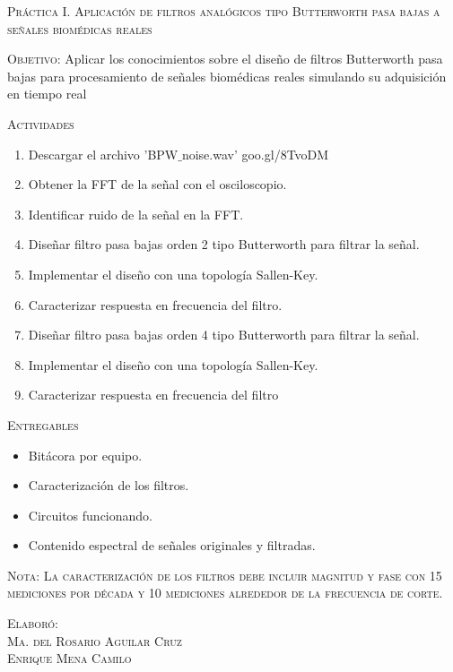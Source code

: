 \documentclass[10pt,letterpaper,spanish,twoside]{report}
\begin{document}
\docdate

\begin{center}
 \textsc{\asignatura}\vspace{.2em}
\end{center}

\textsc{Práctica I. Aplicación de filtros analógicos tipo Butterworth pasa bajas a señales biomédicas reales}

\textsc{Objetivo:} Aplicar los conocimientos sobre el diseño de filtros Butterworth pasa bajas para procesamiento de señales biomédicas reales simulando su adquisición en tiempo real

\textsc{Actividades}
\begin{enumerate}
  \item Descargar el archivo 'BPW$\_$noise.wav' goo.gl/8TvoDM
  \item Obtener la FFT de la señal con el osciloscopio.
  \item Identificar ruido de la señal en la FFT.
  \item Diseñar filtro pasa bajas orden 2 tipo Butterworth para filtrar la señal.
  \item Implementar el diseño con una topología Sallen-Key.
  \item Caracterizar respuesta en frecuencia del filtro.
  \item Diseñar filtro pasa bajas orden 4 tipo Butterworth para filtrar la señal.
  \item Implementar el diseño con una topología Sallen-Key.
  \item Caracterizar respuesta en frecuencia del filtro 
\end{enumerate}

\textsc{Entregables}
\begin{itemize}
  \item Bitácora por equipo.
  \item Caracterización de los filtros.
  \item Circuitos funcionando.
  \item Contenido espectral de señales originales y filtradas.
\end{itemize}

\textsc{Nota: La caracterización de los filtros debe incluir magnitud y fase con 15 mediciones por década y 10 mediciones alrededor de la frecuencia de corte.}
\vfill
\begin{flushright}
\textsc{Elaboró:\\
Ma. del Rosario Aguilar Cruz\\
Enrique Mena Camilo}
\end{flushright}
\end{document}
